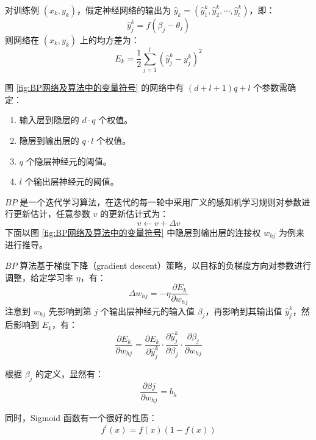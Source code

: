 \documentclass[12pt, a4paper]{article} %
\begin{document}
对训练例 $(x_k, y_k)$，假定神经网络的输出为 $\hat{y}_k = (\hat{y}_1^k, \hat{y}_2^k, \cdots, \hat{y}_l^k)$，即：
\begin{equation*}
    \hat{y}_j^k = f(\beta_j - \theta_j)
\end{equation*}
则网络在 $(x_k, y_k)$ 上的均方差为：
\begin{equation*}
    E_k = \frac{1}{2} \sum_{j = 1}^{l} (\hat{y}_j^k - y_j^k)^2
\end{equation*}

图 \ref{fig:BP网络及算法中的变量符号} 的网络中有 $(d + l + 1) q + l$ 个参数需确定：
\begin{enumerate}[\hspace*{2em} i.]
    \item 输入层到隐层的 $d \cdot q$ 个权值。
    \item 隐层到输出层的 $q \cdot l$ 个权值。
    \item $q$ 个隐层神经元的阈值。
    \item $l$ 个输出层神经元的阈值。
\end{enumerate}

$BP$ 是一个迭代学习算法，在迭代的每一轮中采用广义的感知机学习规则对参数进行更新估计，任意参数 $v$ 的更新估计式为：
\begin{equation*}
    v \leftarrow v + \Delta v
\end{equation*}
下面以图 \ref{fig:BP网络及算法中的变量符号} 中隐层到输出层的连接权 $w_{hj}$ 为例来进行推导。

$BP$ 算法基于梯度下降（gradient descent）策略，以目标的负梯度方向对参数进行调整，给定学习率 $\eta$，有：
\begin{equation*}
    \Delta w_{hj} = - \eta \frac{\partial E_k}{\partial w_{hj}}
\end{equation*}
注意到 $w_{hj}$ 先影响到第 $j$ 个输出层神经元的输入值 $\beta_{j}$，再影响到其输出值 $\hat{y}_j^k$，然后影响到 $E_k$，有：
\begin{equation*}
    \frac{\partial E_k}{\partial w_{hj}} = \frac{\partial E_k}{\partial \hat{y}_j^k} \cdot \frac{\partial \hat{y}_j^k}{\partial \beta_{j}} \cdot \frac{\partial \beta_j}{\partial w_{hj}}
\end{equation*}

根据 $\beta_{j}$ 的定义，显然有：
\begin{equation*}
    \frac{\partial \beta{j}}{\partial w_{hj}} = b_h
\end{equation*}

同时，Sigmoid 函数有一个很好的性质：
\begin{equation*}
    f^{\prime} (x) = f(x) (1 - f(x))
\end{equation*}
\end{document}
